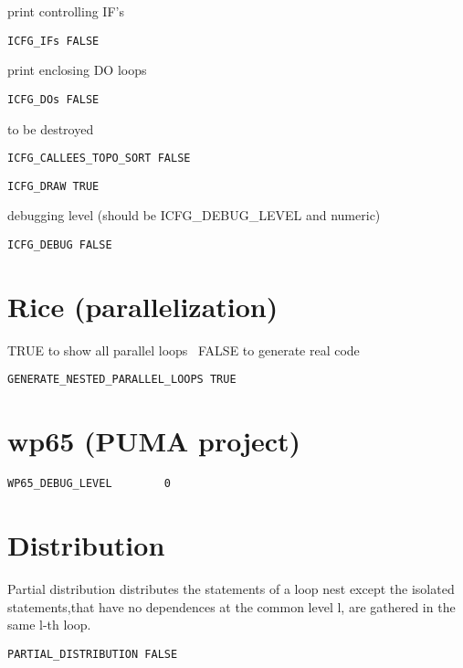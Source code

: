 print controlling IF's

\begin{verbatim}
ICFG_IFs FALSE
\end{verbatim}

print enclosing DO loops

\begin{verbatim}
ICFG_DOs FALSE
\end{verbatim}

to be destroyed

\begin{verbatim}
ICFG_CALLEES_TOPO_SORT FALSE
\end{verbatim}

\begin{verbatim}
ICFG_DRAW TRUE
\end{verbatim}

debugging level (should be ICFG_DEBUG_LEVEL and numeric)

\begin{verbatim}
ICFG_DEBUG FALSE
\end{verbatim}

\section{Rice (parallelization)}

TRUE to show all parallel loops  \
FALSE to generate real code

\begin{verbatim}
GENERATE_NESTED_PARALLEL_LOOPS TRUE
\end{verbatim}

\section{wp65 (PUMA project)}

\begin{verbatim}
WP65_DEBUG_LEVEL        0
\end{verbatim}

\section{Distribution}

Partial distribution distributes the statements of a loop nest except
 the isolated statements,that have no dependences at the common level l,
 are gathered in the same l-th loop.

\begin{verbatim}
PARTIAL_DISTRIBUTION FALSE
\end{verbatim}


